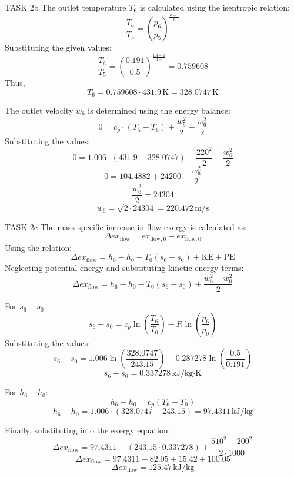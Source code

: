 TASK 2b  
The outlet temperature \( T_6 \) is calculated using the isentropic relation:  
\[
\frac{T_6}{T_5} = \left( \frac{p_6}{p_5} \right)^{\frac{\kappa-1}{\kappa}}
\]  
Substituting the given values:  
\[
\frac{T_6}{T_5} = \left( \frac{0.191}{0.5} \right)^{\frac{1.4-1}{1.4}} = 0.759608
\]  
Thus,  
\[
T_6 = 0.759608 \cdot 431.9 \, \text{K} = 328.0747 \, \text{K}
\]  

The outlet velocity \( w_6 \) is determined using the energy balance:  
\[
0 = c_p \cdot (T_5 - T_6) + \frac{w_5^2}{2} - \frac{w_6^2}{2}
\]  
Substituting the values:  
\[
0 = 1.006 \cdot (431.9 - 328.0747) + \frac{220^2}{2} - \frac{w_6^2}{2}
\]  
\[
0 = 104.4882 + 24200 - \frac{w_6^2}{2}
\]  
\[
\frac{w_6^2}{2} = 24304
\]  
\[
w_6 = \sqrt{2 \cdot 24304} = 220.472 \, \text{m/s}
\]  

TASK 2c  
The mass-specific increase in flow exergy is calculated as:  
\[
\Delta ex_{\text{flow}} = ex_{\text{flow},6} - ex_{\text{flow},0}
\]  
Using the relation:  
\[
\Delta ex_{\text{flow}} = h_6 - h_0 - T_0 (s_6 - s_0) + \text{KE} + \text{PE}
\]  
Neglecting potential energy and substituting kinetic energy terms:  
\[
\Delta ex_{\text{flow}} = h_6 - h_0 - T_0 (s_6 - s_0) + \frac{w_6^2 - w_0^2}{2}
\]  

For \( s_6 - s_0 \):  
\[
s_6 - s_0 = c_p \ln \left( \frac{T_6}{T_0} \right) - R \ln \left( \frac{p_6}{p_0} \right)
\]  
Substituting the values:  
\[
s_6 - s_0 = 1.006 \ln \left( \frac{328.0747}{243.15} \right) - 0.287278 \ln \left( \frac{0.5}{0.191} \right)
\]  
\[
s_6 - s_0 = 0.337278 \, \text{kJ/kg·K}
\]  

For \( h_6 - h_0 \):  
\[
h_6 - h_0 = c_p (T_6 - T_0)
\]  
\[
h_6 - h_0 = 1.006 \cdot (328.0747 - 243.15) = 97.4311 \, \text{kJ/kg}
\]  

Finally, substituting into the exergy equation:  
\[
\Delta ex_{\text{flow}} = 97.4311 - (243.15 \cdot 0.337278) + \frac{510^2 - 200^2}{2 \cdot 1000}
\]  
\[
\Delta ex_{\text{flow}} = 97.4311 - 82.05 + 15.42 + 100.05
\]  
\[
\Delta ex_{\text{flow}} = 125.47 \, \text{kJ/kg}
\]